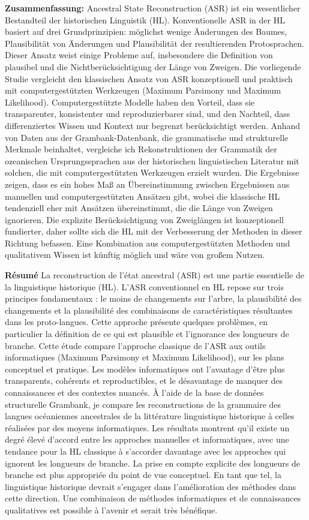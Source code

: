\documentclass[12pt,letterpaper]{article}
\begin{document}
\textbf{Zusammenfassung:}
Ancestral State Reconstruction (ASR) ist ein wesentlicher Bestandteil der historischen Linguistik (HL). Konventionelle ASR in der HL basiert auf drei Grundprinzipien: möglichst wenige Änderungen des Baumes, Plausibilität von Änderungen und Plausibilität der resultierenden Protosprachen. Dieser Ansatz weist einige Probleme auf, insbesondere die Definition von plausibel und die Nichtberücksichtigung der Länge von Zweigen. Die vorliegende Studie vergleicht den klassischen Ansatz von ASR konzeptionell und praktisch mit computergestützten Werkzeugen (Maximum Parsimony und Maximum Likelihood). Computergestützte Modelle haben den Vorteil, dass sie transparenter, konsistenter und reproduzierbarer sind, und den Nachteil, dass differenziertes Wissen und Kontext nur begrenzt berücksichtigt werden. Anhand von Daten aus der Grambank-Datenbank, die grammatische und strukturelle Merkmale beinhaltet, vergleiche ich Rekonstruktionen der Grammatik der ozeanischen Ursprungssprachen aus der historischen linguistischen Literatur mit solchen, die mit computergestützten Werkzeugen erzielt wurden. Die Ergebnisse zeigen, dass es ein hohes Maß an Übereinstimmung zwischen Ergebnissen aus manuellen und computergestützten Ansätzen gibt, wobei die klassische HL tendenziell eher mit Ansätzen übereinstimmt, die die Länge von Zweigen ignorieren. Die explizite Berücksichtigung von Zweiglängen ist konzeptionell fundierter, daher sollte sich die HL mit der Verbesserung der Methoden in dieser Richtung befassen. Eine Kombination aus computergestützten Methoden und qualitativem Wissen ist künftig möglich und wäre von großem Nutzen.

\textbf{Résumé}
La reconstruction de l'état ancestral (ASR) est une partie essentielle de la linguistique historique (HL). L'ASR conventionnel en HL repose sur trois principes fondamentaux : le moins de changements sur l'arbre, la plausibilité des changements et la plausibilité des combinaisons de caractéristiques résultantes dans les proto-langues. Cette approche présente quelques problèmes, en particulier la définition de ce qui est plausible et l'ignorance des longueurs de branche. Cette étude compare l'approche classique de l'ASR aux outils informatiques (Maximum Parsimony et Maximum Likelihood), sur les plans conceptuel et pratique. Les modèles informatiques ont l'avantage d'être plus transparents, cohérents et reproductibles, et le désavantage de manquer des connaissances et des contextes nuancés. À l'aide de la base de données structurelle Grambank, je compare les reconstructions de la grammaire des langues océaniennes ancestrales de la littérature linguistique historique à celles réalisées par des moyens informatiques. Les résultats montrent qu'il existe un degré élevé d'accord entre les approches manuelles et informatiques, avec une tendance pour la HL classique à s'accorder davantage avec les approches qui ignorent les longueurs de branche. La prise en compte explicite des longueurs de branche est plus appropriée du point de vue conceptuel. En tant que tel, la linguistique historique devrait s'engager dans l'amélioration des méthodes dans cette direction. Une combinaison de méthodes informatiques et de connaissances qualitatives est possible à l'avenir et serait très bénéfique.
\end{document}
